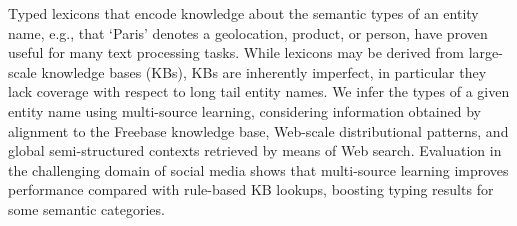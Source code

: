 Typed lexicons that encode knowledge about the semantic types of an entity name, e.g., that ‘Paris' denotes a geolocation, product, or person, have proven useful for many text processing tasks. While lexicons may be derived from large-scale knowledge bases (KBs), KBs are inherently imperfect, in particular they lack coverage with respect to long tail entity names. We infer the types of a given entity name using multi-source learning, considering information obtained by alignment to the Freebase knowledge base, Web-scale distributional patterns, and global semi-structured contexts retrieved by means of Web search. Evaluation in the challenging domain of social media shows that multi-source learning improves performance compared with rule-based KB lookups, boosting typing results for some semantic categories.
